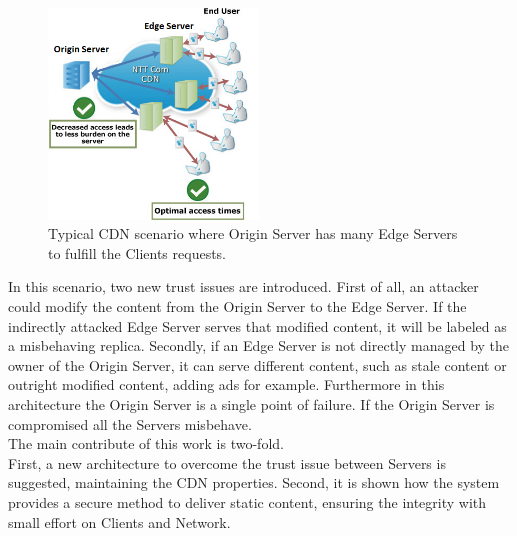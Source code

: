 \documentclass[hidelinks,conference,compsoc]{IEEEtran}
\begin{document}
\begin{figure}[!t]
\centering
\includegraphics[width=2.2in]{images/cdn.png}

\label{fig:CDN}
\caption{Typical CDN scenario where Origin Server has many Edge Servers to fulfill the Clients requests.}
\end{figure} 

In this scenario, two new trust issues are introduced. First of all, an attacker could modify the content from the Origin Server to the Edge Server. If the indirectly attacked Edge Server serves that modified content, it will be labeled as a misbehaving replica. Secondly, if an Edge Server is not directly managed by the owner of the Origin Server, it can serve different content, such as stale content or outright modified content, adding ads for example.
Furthermore in this architecture the Origin Server is a single point of failure. If the Origin Server is compromised all the Servers misbehave.\\
The main contribute of this work is two-fold.\\First, a new architecture to overcome the trust issue between Servers is suggested, maintaining the CDN properties. Second, it is shown how the system provides a secure method to deliver static content, ensuring the integrity with small effort on Clients and Network. 
\end{document}

